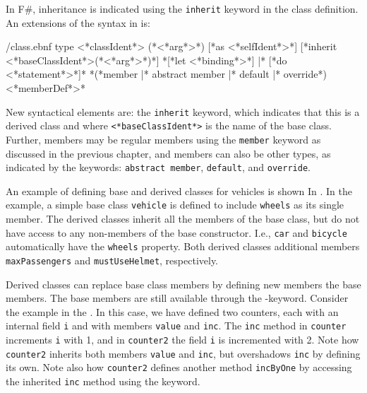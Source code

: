 In F\#, inheritance is indicated using the \lstinline[language=syntax]{inherit} keyword in the class definition. An extensions of the syntax in  is:
%
\begin{verbatimwrite}{\ebnf/class.ebnf}
type <*classIdent*> ({*<*arg*>*}) [*as <*selfIdent*>*] 
  [*inherit <*baseClassIdent*>({*<*arg*>*})*]
  {*[*let <*binding*>*] |* [*do <*statement*>*]*}
  {*(*member |* abstract member |* default |* override*) <*memberDef*>*}
\end{verbatimwrite}
%
New syntactical elements are: the  \lstinline{inherit} keyword, which indicates that this is a derived class and where \lstinline[language=syntax]{<*baseClassIdent*>} is the name of the base class. Further, members may be regular members using the \lstinline{member} keyword as discussed in the previous chapter, and members can also be other types, as indicated by the keywords: \lstinline{abstract member}, \lstinline{default}, and \lstinline{override}.

An example of defining base and derived classes for vehicles is shown In .
%
%
In the example, a simple base class \lstinline{vehicle} is defined to include \lstinline{wheels} as its single member. The derived classes inherit all the members of the base class, but do not have access to any non-members of the base constructor. I.e., \lstinline{car} and \lstinline{bicycle} automatically have the \lstinline{wheels} property. Both derived classes additional members \lstinline{maxPassengers} and \lstinline{mustUseHelmet}, respectively.

Derived classes can replace base class members by defining new members  the base members. The base members are still available through the -keyword. Consider the example in the .
%
%
In this case, we have defined two counters, each with an internal field \lstinline{i} and with members \lstinline{value} and \lstinline{inc}. The \lstinline{inc} method in \lstinline{counter} increments \lstinline{i} with 1, and in \lstinline{counter2} the field \lstinline{i} is incremented with 2. Note how \lstinline{counter2} inherits both members \lstinline{value} and \lstinline{inc}, but overshadows \lstinline{inc} by defining its own. Note also how \lstinline{counter2} defines another method \lstinline{incByOne} by accessing the inherited \lstinline{inc} method using the  keyword.

